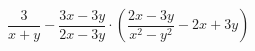 \begin{ex}[type=expression]
	\begin{condition}
		\( \dfrac{3}{x+y}-\dfrac{3x-3y}{2x-3y}\cdot\left( \dfrac{2x-3y}{x^2-y^2}-2x+3y \right) \)
	\end{condition}
\end{ex}